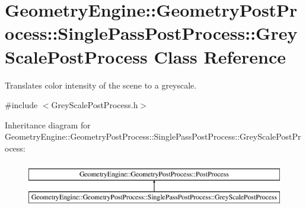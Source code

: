 \hypertarget{class_geometry_engine_1_1_geometry_post_process_1_1_single_pass_post_process_1_1_grey_scale_post_process}{}\section{Geometry\+Engine\+::Geometry\+Post\+Process\+::Single\+Pass\+Post\+Process\+::Grey\+Scale\+Post\+Process Class Reference}
\label{class_geometry_engine_1_1_geometry_post_process_1_1_single_pass_post_process_1_1_grey_scale_post_process}


Translates color intensity of the scene to a greyscale.  




{\ttfamily \#include $<$Grey\+Scale\+Post\+Process.\+h$>$}

Inheritance diagram for Geometry\+Engine\+::Geometry\+Post\+Process\+::Single\+Pass\+Post\+Process\+::Grey\+Scale\+Post\+Process\+:\begin{figure}[H]
\begin{center}
\leavevmode
\includegraphics[height=2.000000cm]{class_geometry_engine_1_1_geometry_post_process_1_1_single_pass_post_process_1_1_grey_scale_post_process}
\end{center}
\end{figure}
